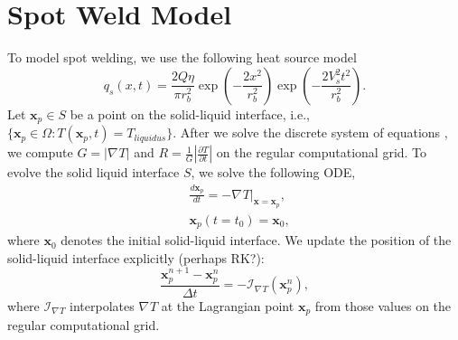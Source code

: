 \documentclass[a4paper,12pt]{article}
\newcommand{\V}[1]{\boldsymbol{#1}}
\newcommand{\B}[1]{\mathbf{#1}}
\newcommand{\grad}[1]{\nabla_{#1}}
\begin{document}
%
%
%
%
%


\section{Spot Weld Model}
To model spot welding, we use the following heat source model
\begin{equation}
q_s(x,t) =  \frac{2Q\eta}{\pi r_b^2} \exp \left( -\frac{ 2x^2}{ r_b^2} \right)   \exp \left( -\frac{ 2V_s^2t^2}{ r_b^2} \right).
\end{equation}
Let $\V{x}_p \in S$ be a point on the solid-liquid interface, i.e., $\{  \V{x}_p \in \Omega : T(\V{x}_p ,t) = T_{liquidus}  \}$.
After we solve the discrete system of equations , we compute $G =  | \grad{} T |$ and $R = \frac{1}{G} | \frac{\partial T}{\partial t} |$ on the regular computational grid. To evolve the solid liquid interface $S$, we solve the following ODE,
\begin{align}
& \frac{d \V{x}_p }{dt} = - \grad{} T \bigg|_{\V{x} = \V{x}_p},  \label{eq:sl_cont } \\
& \V{x}_p (t = t_0) = \V{x}_{0},
\end{align}
where $\V{x}_0$ denotes the initial solid-liquid interface.  We update the position of the solid-liquid interface explicitly (perhaps RK?):
\begin{equation}
\frac{\V{x}_p^{n+1} - \V{x}_p^n}{\Delta t} = -   \mathcal{I}_{ \grad{} T } (\V{x}^{n}_p) , 
\end{equation}
where $\mathcal{I}_{\grad{} T}$ interpolates $\grad{} T$ at the Lagrangian point $\V{x}_p$ from those values on the regular computational grid. 
\end{document}

